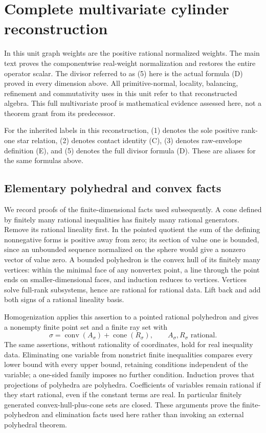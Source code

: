 \documentclass[
  11pt,
]{article}
\begin{document}
\section{Complete multivariate cylinder
reconstruction}\label{complete-multivariate-cylinder-reconstruction}

In this unit graph weights are the positive rational normalized weights.
The main text proves the componentwise real-weight normalization and
restores the entire operator scalar. The divisor referred to as (5) here
is the actual formula (D) proved in every dimension above. All
primitive-normal, locality, balancing, refinement and commutativity uses
in this unit refer to that reconstructed algebra. This full multivariate
proof is mathematical evidence assessed here, not a theorem grant from
its predecessor.

For the inherited labels in this reconstruction, (1) denotes the sole
positive rank-one star relation, (2) denotes contact identity (C),
(3) denotes raw-envelope definition (E), and (5) denotes the full
divisor formula (D). These are aliases for the same formulas above.

\subsection{Elementary polyhedral and convex
facts}\label{elementary-polyhedral-and-convex-facts}

We record proofs of the finite-dimensional facts used subsequently. A
cone defined by finitely many rational inequalities has finitely many
rational generators. Remove its rational lineality first. In the pointed
quotient the sum of the defining nonnegative forms is positive away from
zero; its section of value one is bounded, since an unbounded sequence
normalized on the sphere would give a nonzero vector of value zero. A
bounded polyhedron is the convex hull of its finitely many vertices:
within the minimal face of any nonvertex point, a line through the point
ends on smaller-dimensional faces, and induction reduces to vertices.
Vertices solve full-rank subsystems, hence are rational for rational
data. Lift back and add both signs of a rational lineality basis.

Homogenization applies this assertion to a pointed rational polyhedron
and gives a nonempty finite point set and a finite ray set with \[
 \sigma=\operatorname{conv}(A_\sigma)+\operatorname{cone}(R_\sigma),
                    \qquad A_\sigma,R_\sigma\text{ rational}.       \tag{4}
\] The same assertions, without rationality of coordinates, hold for
real inequality data. Eliminating one variable from nonstrict finite
inequalities compares every lower bound with every upper bound,
retaining conditions independent of the variable; a one-sided family
imposes no further condition. Induction proves that projections of
polyhedra are polyhedra. Coefficients of variables remain rational if
they start rational, even if the constant terms are real. In particular
finitely generated convex-hull-plus-cone sets are closed. These
arguments prove the finite-polyhedron and elimination facts used here
rather than invoking an external polyhedral theorem.
\end{document}
